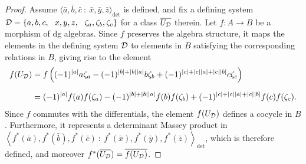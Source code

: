 \documentclass[11pt]{article}
\theoremstyle{definition}
\theoremstyle{definition}
\begin{document}
\begin{proof} 
Assume $\langle \bar a,\bar b,\bar c \ :\ \bar x, \bar y, \bar z\rangle_{\det}$ is defined, and fix a 
defining system $\mD=\left\{a,b,c,\ \ x,y,z,\ \ \zeta_a,\zeta_b,\zeta_c\right\}$
for a class $\overline{U_\mathcal D}$ therein.
Let $f:A\to B$ be a morphism of dg algebras.
Since $f$ preserves the algebra structure, it maps the elements in the defining system $\mathcal D$
to elements in $B$ satisfying the corresponding relations in $B$,
giving rise to the element
\begin{align*}
    f(U_\mathcal D) &= f\left((-1)^{|a|}a\zeta_a - (-1)^{|b| + |b||a|}b \zeta_b + (-1)^{|c|+ |c||a| + |c||b| }c\zeta_c\right) \\[0.25cm]
    &= (-1)^{|a|}f(a)f(\zeta_a) - (-1)^{|b| + |b||a|}f(b)f(\zeta_b) + (-1)^{|c|+ |c||a| + |c||b| }f(c)f(\zeta_c).
\end{align*}
Since $f$ commutes with the differentials, the element $f(U_\mathcal D)$ defines a cocycle in $B$.
Furthermore, it represents a determinant Massey product in $\left\langle f^*(\bar a),f^*(\bar b),f^*(\bar c) \ : \ f^*(\bar x), f^*(\bar y), f^*(\bar z)\right\rangle_{\det}$,
which is therefore defined, and moreover $f^*(\overline{U_\mathcal D}) = \overline{f(U_\mathcal D)}$.


\end{proof}
\end{document}
